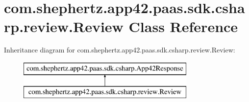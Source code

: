 \hypertarget{classcom_1_1shephertz_1_1app42_1_1paas_1_1sdk_1_1csharp_1_1review_1_1_review}{\section{com.\+shephertz.\+app42.\+paas.\+sdk.\+csharp.\+review.\+Review Class Reference}
\label{classcom_1_1shephertz_1_1app42_1_1paas_1_1sdk_1_1csharp_1_1review_1_1_review}
}
Inheritance diagram for com.\+shephertz.\+app42.\+paas.\+sdk.\+csharp.\+review.\+Review\+:\begin{figure}[H]
\begin{center}
\leavevmode
\includegraphics[height=2.000000cm]{classcom_1_1shephertz_1_1app42_1_1paas_1_1sdk_1_1csharp_1_1review_1_1_review}
\end{center}
\end{figure}
